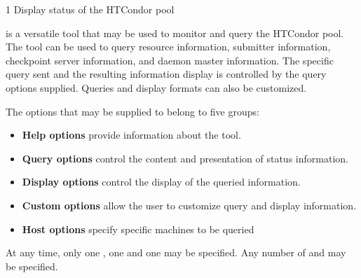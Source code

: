 \begin{ManPage}{\label{man-condor-status}}{1}
{Display status of the HTCondor pool}

\Synopsis {}
\ToolDebugOption
{}

\Description
{} is a versatile tool that may be used to monitor and query the 
HTCondor pool.  The  tool can be used to query resource 
information, submitter information, checkpoint server information, and daemon
master information.  The specific query sent and the resulting information 
display is controlled by the query options supplied.  Queries and display 
formats can also be customized.

The options that may be supplied to  belong to five groups:
\begin{itemize}
	\item \textbf{Help options} provide information about the 
		tool.
	\item \textbf{Query options} control the content and presentation of status
		information.
	\item \textbf{Display options} control the display of the queried 
		information.
	\item \textbf{Custom options} allow the user to customize query and
		display information.
	\item \textbf{Host options} specify specific machines to be queried
\end{itemize}

At any time, only one , one  and one
 may be specified.  
Any number of  and  may be specified.


\end{ManPage}

